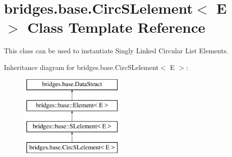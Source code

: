 \hypertarget{classbridges_1_1base_1_1_circ_s_lelement}{}\section{bridges.\+base.\+Circ\+S\+Lelement$<$ E $>$ Class Template Reference}
\label{classbridges_1_1base_1_1_circ_s_lelement}


This class can be used to instantiate Singly Linked Circular List Elements.  


Inheritance diagram for bridges.\+base.\+Circ\+S\+Lelement$<$ E $>$\+:\begin{figure}[H]
\begin{center}
\leavevmode
\includegraphics[height=4.000000cm]{classbridges_1_1base_1_1_circ_s_lelement}
\end{center}
\end{figure}
